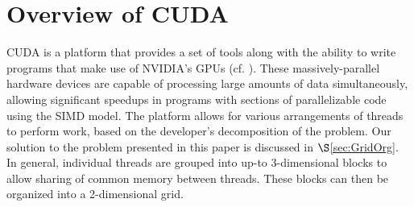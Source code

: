 \documentclass[12pt]{ucthesis}
\begin{document}
%
%
%
%
%

\section{Overview of CUDA}
CUDA is a platform that provides a set of tools along with the ability to 
write programs that make use of NVIDIA's GPUs (cf. 
\cite{nvidia2012programming}). These massively-parallel hardware devices are 
capable of processing large amounts of data simultaneously, allowing 
significant speedups in programs with sections of parallelizable code using 
the SIMD model. The platform allows for various arrangements of threads to 
perform work, based on the developer's decomposition of the problem. Our 
solution to the problem presented in this paper is discussed in 
$\S$\ref{sec:GridOrg}. In general, individual threads are grouped into up-to 
3-dimensional blocks to allow sharing of common memory between threads. These 
blocks can then be organized into a 2-dimensional grid. 
\end{document}
